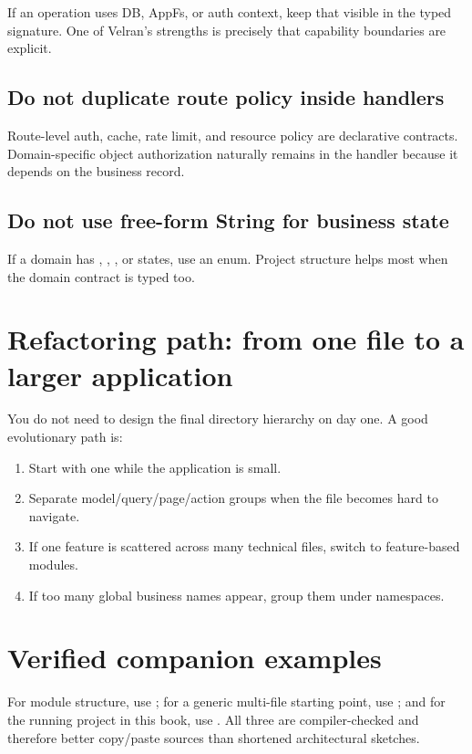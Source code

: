 If an operation uses DB, AppFs, or auth context, keep that visible in the typed signature. One of Velran's strengths is precisely that capability boundaries are explicit.

\subsection*{Do not duplicate route policy inside handlers}

Route-level auth, cache, rate limit, and resource policy are declarative contracts. Domain-specific object authorization naturally remains in the handler because it depends on the business record.

\subsection*{Do not use free-form String for business state}

If a domain has , , , or  states, use an enum. Project structure helps most when the domain contract is typed too.

\section{Refactoring path: from one file to a larger application}

You do not need to design the final directory hierarchy on day one. A good evolutionary path is:

\begin{enumerate}
  \item Start with one  while the application is small.
  \item Separate model/query/page/action groups when the file becomes hard to navigate.
  \item If one feature is scattered across many technical files, switch to feature-based modules.
  \item If too many global business names appear, group them under  namespaces.
\end{enumerate}

\section{Verified companion examples}
For module structure, use ; for a generic multi-file starting point, use ; and for the running project in this book, use . All three are compiler-checked and therefore better copy/paste sources than shortened architectural sketches.

